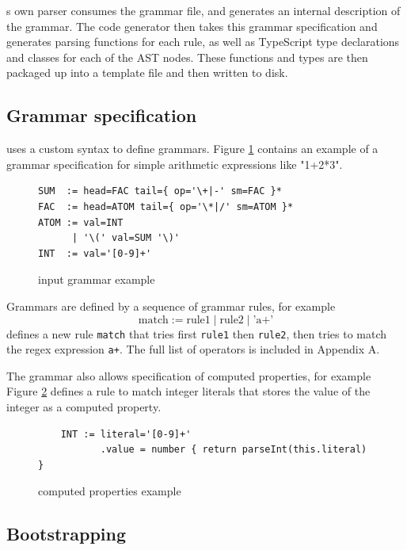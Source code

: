 \tsPEG{}s own parser consumes the grammar file, and generates an internal description of the grammar. The code generator then takes this grammar specification and generates parsing functions for each rule, as well as TypeScript type declarations and classes for each of the AST nodes. These functions and types are then packaged up into a template file and then written to disk.

\subsection{Grammar specification}

\tsPEG{} uses a custom syntax to define grammars. Figure \ref{tspegexample} contains an example of a grammar specification for simple arithmetic expressions like "1+2*3".

\begin{figure}
    \caption{\tsPEG{} input grammar example}
    \label{tspegexample}
    \begin{lstlisting}
SUM  := head=FAC tail={ op='\+|-' sm=FAC }*
FAC  := head=ATOM tail={ op='\*|/' sm=ATOM }*
ATOM := val=INT
      | '\(' val=SUM '\)'
INT  := val='[0-9]+'
    \end{lstlisting}
\end{figure}

Grammars are defined by a sequence of grammar rules, for example
    \[\text{match} := \text{rule1} \mathbin{|} \text{rule2} \mathbin{|} \text{'a+'}\]
    defines a new rule \verb|match| that tries first \verb|rule1| then \verb|rule2|, then tries to match the regex expression \verb|a+|. The full list of operators is included in Appendix A.

    The \tsPEG{} grammar also allows specification of computed properties, for example Figure \ref{tspegcomputed} defines a rule to match integer literals that stores the value of the integer as a computed property.

\begin{figure}
    \caption{\tsPEG{} computed properties example}
    \label{tspegcomputed}
    \begin{lstlisting}
    INT := literal='[0-9]+'
           .value = number { return parseInt(this.literal) }
    \end{lstlisting}
\end{figure}

\subsection{Bootstrapping}

